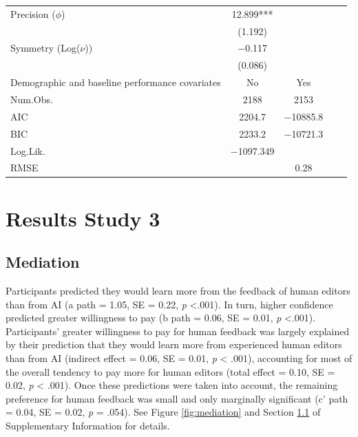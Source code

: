 \documentclass[11pt]{report}
\begin{document}
\begin{append}
\begin{table}[h]
\begin{tabular}{lcccc}
\midrule 
Precision ($\phi$)                                                                            & \num{12.899}*** &          \\
& (\num{1.192})   &                  \\
Symmetry (Log($\nu$))                                                                          & \num{-0.117}    &                \\
& (\num{0.086})   &                      \\
Demographic and baseline performance covariates & No & Yes \\
\midrule 
Num.Obs.                                                                         & \num{2188}      & \num{2153}        \\
AIC                                                                              & \num{2204.7}    & \num{-10885.8}  \\
BIC                                                                              & \num{2233.2}    & \num{-10721.3}   \\
Log.Lik.                                                                         & \num{-1097.349} &                            \\
RMSE                                                                             &                  & \num{0.28}          \\
\bottomrule
    \end{tabular}
    \label{tab:beta2}
\end{table}



\FloatBarrier

\section{Results Study 3}
\subsection{Mediation}\label{sec:mediation}
Participants predicted they would learn more from the feedback of human editors than from AI (a path = 1.05, SE = 0.22, \textit{p} \textless .001). In turn, higher confidence predicted greater willingness to pay (b path = 0.06, SE = 0.01, \textit{p} \textless .001). Participants’ greater willingness to pay for human feedback was largely explained by their prediction that they would learn more from experienced human editors than from AI (indirect effect = 0.06, SE = 0.01, \textit{p} < .001), accounting for most of the overall tendency to pay more for human editors (total effect = 0.10, SE = 0.02, \textit{p} < .001). Once these predictions were taken into account, the remaining preference for human feedback was small and only marginally significant (c' path = 0.04, SE = 0.02, \textit{p} = .054).  See Figure \ref{fig:mediation} and Section \ref{sec:mediation} of Supplementary Information for details.


\end{append}
\end{document}
